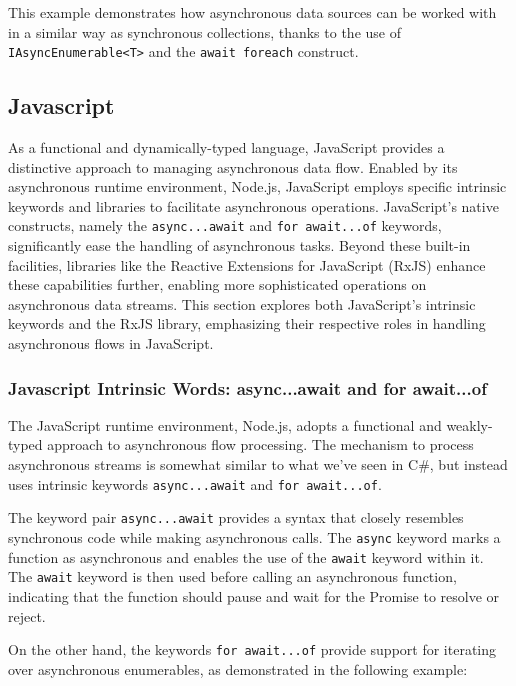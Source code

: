 This example demonstrates how asynchronous data sources can be worked with in a similar way as synchronous collections, thanks to the use of \texttt{IAsyncEnumerable<T>} and the \texttt{await foreach} construct.

\subsection{Javascript}
\label{jsae}

As a functional and dynamically-typed language, JavaScript provides a distinctive approach to managing asynchronous data flow. Enabled by its asynchronous runtime environment, Node.js, JavaScript employs specific intrinsic keywords and libraries to facilitate asynchronous operations. JavaScript's native constructs, namely the \texttt{async...await} and \texttt{for await...of} keywords, significantly ease the handling of asynchronous tasks. Beyond these built-in facilities, libraries like the Reactive Extensions for JavaScript (RxJS) enhance these capabilities further, enabling more sophisticated operations on asynchronous data streams. This section explores both JavaScript's intrinsic keywords and the RxJS library, emphasizing their respective roles in handling asynchronous flows in JavaScript.

\subsubsection{Javascript Intrinsic Words: async...await and for await...of}
\label{jsintrin}

The JavaScript runtime environment, Node.js, adopts a functional and weakly-typed approach to asynchronous flow processing. The mechanism to process asynchronous streams is somewhat similar to what we've seen in C\#, but instead uses intrinsic keywords \texttt{async...await} and \texttt{for await...of}.

The keyword pair \texttt{async...await} provides a syntax that closely resembles synchronous code while making asynchronous calls. The \texttt{async} keyword marks a function as asynchronous and enables the use of the \texttt{await} keyword within it. The \texttt{await} keyword is then used before calling an asynchronous function, indicating that the function should pause and wait for the Promise to resolve or reject.

On the other hand, the keywords \texttt{for await...of} provide support for iterating over asynchronous enumerables, as demonstrated in the following example:


